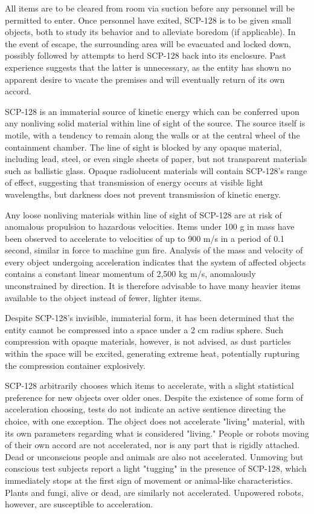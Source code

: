 All items are to be cleared from room via suction before any personnel will be permitted to enter. Once personnel have exited, SCP-128 is to be given small objects, both to study its behavior and to alleviate boredom (if applicable). In the event of escape, the surrounding area will be evacuated and locked down, possibly followed by attempts to herd SCP-128 back into its enclosure. Past experience suggests that the latter is unnecessary, as the entity has shown no apparent desire to vacate the premises and will eventually return of its own accord.

 SCP-128 is an immaterial source of kinetic energy which can be conferred upon any nonliving solid material within line of sight of the source. The source itself is motile, with a tendency to remain along the walls or at the central wheel of the containment chamber. The line of sight is blocked by any opaque material, including lead, steel, or even single sheets of paper, but not transparent materials such as ballistic glass. Opaque radiolucent materials will contain SCP-128's range of effect, suggesting that transmission of energy occurs at visible light wavelengths, but darkness does not prevent transmission of kinetic energy.

Any loose nonliving materials within line of sight of SCP-128 are at risk of anomalous propulsion to hazardous velocities. Items under 100 g in mass have been observed to accelerate to velocities of up to 900 m\slash s in a period of 0.1 second, similar in force to machine gun fire. Analysis of the mass and velocity of every object undergoing acceleration indicates that the system of affected objects contains a constant linear momentum of 2,500 kg m\slash s, anomalously unconstrained by direction. It is therefore advisable to have many heavier items available to the object instead of fewer, lighter items.

Despite SCP-128's invisible, immaterial form, it has been determined that the entity cannot be compressed into a space under a 2 cm radius sphere. Such compression with opaque materials, however, is not advised, as dust particles within the space will be excited, generating extreme heat, potentially rupturing the compression container explosively.

SCP-128 arbitrarily chooses which items to accelerate, with a slight statistical preference for new objects over older ones. Despite the existence of some form of acceleration choosing, tests do not indicate an active sentience directing the choice, with one exception. The object does not accelerate "living" material, with its own parameters regarding what is considered "living." People or robots moving of their own accord are not accelerated, nor is any part that is rigidly attached. Dead or unconscious people and animals are also not accelerated. Unmoving but conscious test subjects report a light "tugging" in the presence of SCP-128, which immediately stops at the first sign of movement or animal-like characteristics. Plants and fungi, alive or dead, are similarly not accelerated. Unpowered robots, however, are susceptible to acceleration.

